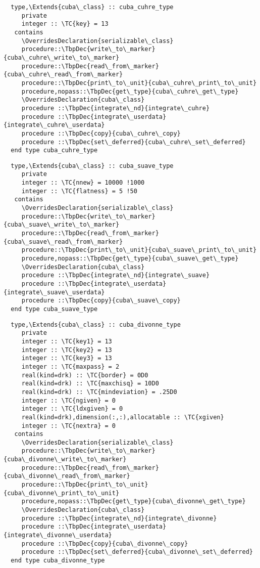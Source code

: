 \begin{Verbatim}
  type,\Extends{cuba\_class} :: cuba_cuhre_type
     private
     integer :: \TC{key} = 13
   contains
     \OverridesDeclaration{serializable\_class}
     procedure::\TbpDec{write\_to\_marker}{cuba\_cuhre\_write\_to\_marker}
     procedure::\TbpDec{read\_from\_marker}{cuba\_cuhre\_read\_from\_marker}
     procedure::\TbpDec{print\_to\_unit}{cuba\_cuhre\_print\_to\_unit}
     procedure,nopass::\TbpDec{get\_type}{cuba\_cuhre\_get\_type}
     \OverridesDeclaration{cuba\_class}
     procedure ::\TbpDec{integrate\_nd}{integrate\_cuhre}
     procedure ::\TbpDec{integrate\_userdata}{integrate\_cuhre\_userdata}
     procedure ::\TbpDec{copy}{cuba\_cuhre\_copy}
     procedure ::\TbpDec{set\_deferred}{cuba\_cuhre\_set\_deferred}
  end type cuba_cuhre_type
\end{Verbatim}
\begin{Verbatim}
  type,\Extends{cuba\_class} :: cuba_suave_type
     private
     integer :: \TC{nnew} = 10000 !1000
     integer :: \TC{flatness} = 5 !50
   contains
     \OverridesDeclaration{serializable\_class}
     procedure::\TbpDec{write\_to\_marker}{cuba\_suave\_write\_to\_marker}
     procedure::\TbpDec{read\_from\_marker}{cuba\_suave\_read\_from\_marker}
     procedure::\TbpDec{print\_to\_unit}{cuba\_suave\_print\_to\_unit}
     procedure,nopass::\TbpDec{get\_type}{cuba\_suave\_get\_type}
     \OverridesDeclaration{cuba\_class}
     procedure ::\TbpDec{integrate\_nd}{integrate\_suave}
     procedure ::\TbpDec{integrate\_userdata}{integrate\_suave\_userdata}
     procedure ::\TbpDec{copy}{cuba\_suave\_copy}
  end type cuba_suave_type
\end{Verbatim}
\begin{Verbatim}
  type,\Extends{cuba\_class} :: cuba_divonne_type
     private
     integer :: \TC{key1} = 13
     integer :: \TC{key2} = 13
     integer :: \TC{key3} = 13
     integer :: \TC{maxpass} = 2
     real(kind=drk) :: \TC{border} = 0D0
     real(kind=drk) :: \TC{maxchisq} = 10D0
     real(kind=drk) :: \TC{mindeviation} = .25D0
     integer :: \TC{ngiven} = 0
     integer :: \TC{ldxgiven} = 0
     real(kind=drk),dimension(:,:),allocatable :: \TC{xgiven}
     integer :: \TC{nextra} = 0
   contains
     \OverridesDeclaration{serializable\_class}
     procedure::\TbpDec{write\_to\_marker}{cuba\_divonne\_write\_to\_marker}
     procedure::\TbpDec{read\_from\_marker}{cuba\_divonne\_read\_from\_marker}
     procedure::\TbpDec{print\_to\_unit}{cuba\_divonne\_print\_to\_unit}
     procedure,nopass::\TbpDec{get\_type}{cuba\_divonne\_get\_type}
     \OverridesDeclaration{cuba\_class}
     procedure ::\TbpDec{integrate\_nd}{integrate\_divonne}
     procedure ::\TbpDec{integrate\_userdata}{integrate\_divonne\_userdata}
     procedure ::\TbpDec{copy}{cuba\_divonne\_copy}
     procedure ::\TbpDec{set\_deferred}{cuba\_divonne\_set\_deferred}
  end type cuba_divonne_type
\end{Verbatim}
